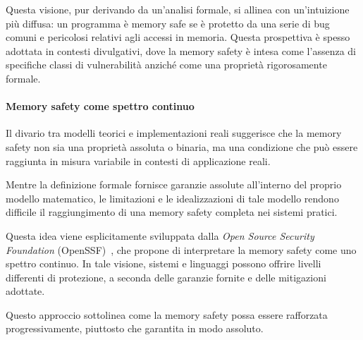 Questa visione, pur derivando da un'analisi formale, si allinea con un'intuizione
più diffusa: un programma è memory safe se è protetto da una serie di bug comuni
e pericolosi relativi agli accessi in memoria. Questa prospettiva è spesso
adottata in contesti divulgativi, dove la memory safety è intesa come l'assenza di
specifiche classi di vulnerabilità anziché come una proprietà rigorosamente formale.

\paragraph{Memory safety come spettro continuo}

Il divario tra modelli teorici e implementazioni reali suggerisce che la memory safety
non sia una proprietà assoluta o binaria, ma una condizione che può essere
raggiunta in misura variabile in contesti di applicazione reali.

Mentre la definizione formale fornisce garanzie assolute all'interno del proprio
modello matematico, le limitazioni e le idealizzazioni di tale modello rendono difficile
il raggiungimento di una memory safety completa nei sistemi pratici.

Questa idea viene esplicitamente sviluppata dalla \textit{Open Source Security
Foundation} (OpenSSF)~\cite{memory_safety_continuum}, che propone di interpretare
la memory safety come uno spettro continuo. In tale visione, sistemi e linguaggi
possono offrire livelli differenti di protezione, a seconda delle garanzie fornite
e delle mitigazioni adottate.

Questo approccio sottolinea come la memory safety possa essere rafforzata progressivamente,
piuttosto che garantita in modo assoluto.
